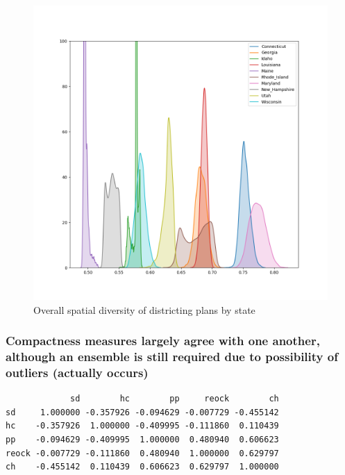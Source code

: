 \documentclass[]{article}
\begin{document}
\begin{figure}
\centering
\includegraphics{../30_results/all_plans_sd.png}
\caption{Overall spatial diversity of districting plans by state}
\end{figure}

\hypertarget{compactness-measures-largely-agree-with-one-another-although-an-ensemble-is-still-required-due-to-possibility-of-outliers-actually-occurs}{%
\subsubsection{Compactness measures largely agree with one another,
although an ensemble is still required due to possibility of outliers
(actually
occurs)}\label{compactness-measures-largely-agree-with-one-another-although-an-ensemble-is-still-required-due-to-possibility-of-outliers-actually-occurs}}

\begin{verbatim}
             sd        hc        pp     reock        ch
sd     1.000000 -0.357926 -0.094629 -0.007729 -0.455142
hc    -0.357926  1.000000 -0.409995 -0.111860  0.110439
pp    -0.094629 -0.409995  1.000000  0.480940  0.606623
reock -0.007729 -0.111860  0.480940  1.000000  0.629797
ch    -0.455142  0.110439  0.606623  0.629797  1.000000
\end{verbatim}
\end{document}
